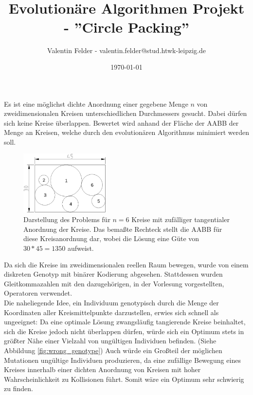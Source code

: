 \documentclass[twoside,bibtotoc]{report}
\title{\textbf{Evolutionäre Algorithmen Projekt - ''Circle Packing''}}
\author{
Valentin Felder - valentin.felder@stud.htwk-leipzig.de
}
\date{\today}
\begin{document}
\maketitle

\tableofcontents 
\newpage




Es ist eine möglichst dichte Anordnung einer gegebene Menge $n$ von zweidimensionalen Kreisen unterschiedlichen Durchmessers gesucht.
Dabei dürfen sich keine Kreise überlappen. Bewertet wird anhand der Fläche der \gls{AABB} der Menge an Kreisen, welche durch den evolutionären Algorithmus minimiert werden soll.

\begin{figure}[h]
 \centering
 \includegraphics [width=0.4\textwidth]{Bilder/1.png}
 \caption{
 	Darstellung des Problems für $n=6$ Kreise mit zufälliger
 	tangentialer Anordnung der Kreise.
 	Das bemaßte Rechteck stellt die \gls{AABB} für diese Kreisanordnung dar,
 	wobei die Lösung eine Güte von $30 * 45 = 1350$ aufweist.
 	}
 \label{fig:problem_definition}
\end{figure}

\nsecend%



Da sich die Kreise im zweidimensionalen reellen Raum bewegen, wurde von einem diskreten Genotyp mit binärer Kodierung abgesehen.
Stattdessen wurden Gleitkommazahlen mit den dazugehörigen, in der Vorlesung vorgestellten, Operatoren verwendet.\\

Die naheliegende Idee, ein Individuum genotypisch durch die Menge der Koordinaten aller Kreismittelpunkte darzustellen, erwies sich schnell als ungeeignet:
Da eine optimale Lösung zwangsläufig tangierende Kreise beinhaltet, sich die Kreise jedoch nicht überlappen dürfen, würde sich ein Optimum stets in größter Nähe einer Vielzahl von ungültigen Individuen befinden. (Siehe Abbildung \ref{fig:wrong_genotype})
Auch würde ein Großteil der möglichen Mutationen ungültige Individuen produzieren, da eine zufällige Bewegung eines Kreises innerhalb einer dichten Anordnung von Kreisen mit hoher Wahrscheinlichkeit zu Kollisionen führt.
Somit wäre ein Optimum sehr schwierig zu finden.\\
\end{document}
